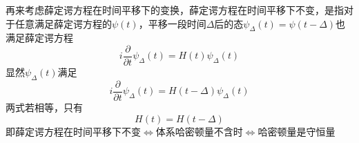 再来考虑薛定谔方程在时间平移下的变换，薛定谔方程在时间平移下不变，是指对于任意满足薛定谔方程的$\psi(t)$，平移一段时间$\Delta $后的态$\psi_\Delta(t)=\psi(t-\Delta)$也满足薛定谔方程
$$i\frac{\partial}{\partial t}\psi_\Delta (t)=H(t)\psi_\Delta(t)$$
显然$\psi_\Delta(t)$满足
$$i\frac{\partial}{\partial t}\psi_\Delta(t)=H(t-\Delta)\psi_\Delta(t)$$
两式若相等，只有
$$H(t)=H(t-\Delta)$$
即薛定谔方程在时间平移下不变$\Leftrightarrow$体系哈密顿量不含时$\Leftrightarrow$哈密顿量是守恒量
